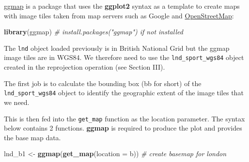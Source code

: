 \documentclass[]{article}
\newenvironment{Shaded}{}{}
\newcommand{\KeywordTok}[1]{\textcolor[rgb]{0.00,0.44,0.13}{\textbf{{#1}}}}
\newcommand{\DataTypeTok}[1]{\textcolor[rgb]{0.56,0.13,0.00}{{#1}}}
\newcommand{\DecValTok}[1]{\textcolor[rgb]{0.25,0.63,0.44}{{#1}}}
\newcommand{\FloatTok}[1]{\textcolor[rgb]{0.25,0.63,0.44}{{#1}}}
\newcommand{\StringTok}[1]{\textcolor[rgb]{0.25,0.44,0.63}{{#1}}}
\newcommand{\CommentTok}[1]{\textcolor[rgb]{0.38,0.63,0.69}{\textit{{#1}}}}
\newcommand{\NormalTok}[1]{{#1}}
\begin{document}
\href{http://journal.r-project.org/archive/2013-1/kahle-wickham.pdf}{ggmap}
is a package that uses the \textbf{ggplot2} syntax as a template to
create maps with image tiles taken from map servers such as Google and
\href{http://www.openstreetmap.org/}{OpenStreetMap}:

\begin{Shaded}
\begin{Highlighting}[]
\KeywordTok{library}\NormalTok{(ggmap) }\CommentTok{# install.packages("ggmap") if not installed}
\end{Highlighting}
\end{Shaded}

The \texttt{lnd} object loaded previously is in British National Grid
but the ggmap image tiles are in WGS84. We therefore need to use the
\texttt{lnd\_sport\_wgs84} object created in the reprojection operation
(see Section III).

The first job is to calculate the bounding box (bb for short) of the
\texttt{lnd\_sport\_wgs84} object to identify the geographic extent of
the image tiles that we need.

\begin{Shaded}
\end{Shaded}

This is then fed into the \texttt{get\_map} function as the location
parameter. The syntax below contains 2 functions. \textbf{ggmap} is
required to produce the plot and provides the base map data.

\begin{Shaded}
\begin{Highlighting}[]
\NormalTok{lnd_b1 <-}\StringTok{ }\KeywordTok{ggmap}\NormalTok{(}\KeywordTok{get_map}\NormalTok{(}\DataTypeTok{location =} \NormalTok{b)) }\CommentTok{# create basemap for london}
\end{Highlighting}
\end{Shaded}
\end{document}
